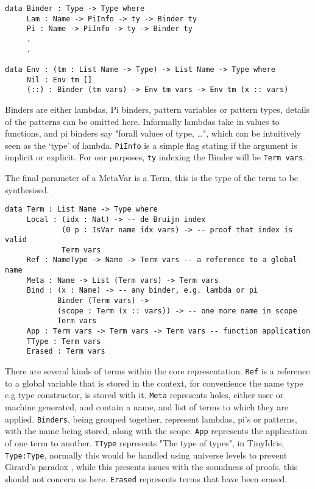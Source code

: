 \documentclass[a4paper]{article}
\begin{document}
\begin{center}
\begin{verbatim}
data Binder : Type -> Type where
	 Lam : Name -> PiInfo -> ty -> Binder ty
	 Pi : Name -> PiInfo -> ty -> Binder ty
	 .
	 .

data Env : (tm : List Name -> Type) -> List Name -> Type where
	 Nil : Env tm []
	 (::) : Binder (tm vars) -> Env tm vars -> Env tm (x :: vars)
\end{verbatim}
\end{center}

Binders are either lambdas, Pi binders, pattern variables or pattern types, details of the patterns can be
omitted here. Informally lambdas take in values to functions, and pi binders say
"forall values of type, \ldots{}", which can be intuitively seen as the `type' of lambda.
\texttt{PiInfo} is a simple flag stating if the argument is implicit or explicit. 
For our purposes, \texttt{ty} indexing the Binder will be \texttt{Term vars}.

The final parameter of a MetaVar is a Term, this is the type of the term to be synthesised.

\begin{center}
\begin{verbatim}
data Term : List Name -> Type where
	 Local : (idx : Nat) -> -- de Bruijn index
			 (0 p : IsVar name idx vars) -> -- proof that index is valid
			 Term vars
	 Ref : NameType -> Name -> Term vars -- a reference to a global name
	 Meta : Name -> List (Term vars) -> Term vars
	 Bind : (x : Name) -> -- any binder, e.g. lambda or pi
			Binder (Term vars) ->
			(scope : Term (x :: vars)) -> -- one more name in scope
			Term vars
	 App : Term vars -> Term vars -> Term vars -- function application
	 TType : Term vars
	 Erased : Term vars
\end{verbatim}
\end{center}

There are several kinds of terms within the core representation. 
\texttt{Ref} is a reference to a global variable that is stored in the context,
for convenience the name type e.g type constructor, is stored with it. \texttt{Meta} represents holes,
either user or machine generated, and contain a name, and list of terms to which 
they are applied. \texttt{Binders}, being grouped together, represent lambdas, pi's or patterns,
with the name being stored, along with the scope. \texttt{App} represents the application
of one term to another. \texttt{TType} represents "The type of types", in TinyIdris, \texttt{Type:Type}, normally this would be 
handled using universe levels to prevent Girard's paradox \cite{10.1007/BFb0014058} ,
  while this presents issues with the soundness of proofs, this should not concern us here.
\texttt{Erased} represents terms that have been erased. 
\end{document}
